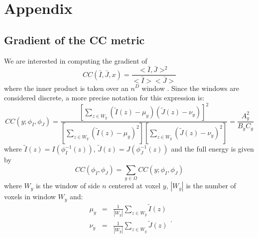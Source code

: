 \clearpage
\appendix
{}
\section*{Appendix}
\label{sec:appendix}

\renewcommand{\thesubsection}{\Alph{subsection}}

\subsection{Gradient of the CC metric}\label{ap:CC_gradient}
We are interested in computing the gradient of
\begin{equation}
    CC(\bar{I}, \bar{J}, x) = \frac{<\bar{I}, \bar{J}>^{2}}{<\bar{I}><\bar{J}>}
\end{equation}
where the inner product is taken over an $n^{D}$ window \citep[see][eq. 4]{Avants2008}. Since the windows are considered discrete, a more precise notation
for this expression is:
\begin{equation}\label{eq:CC_definition}
    CC(y;\phi_{I}, \phi_{J}) = \frac{\left[\sum_{z\in W_{y}} \left(\tilde{I}(z) - \mu_{y}\right)\left(\tilde{J}(z) - \nu_{y}\right)\right]^{2}}
    {\left[\sum_{z \in W_{y}}\left(\tilde{I}(z) - \mu_{y}\right)^{2}\right] \left[\sum_{z \in W_{y}}\left(\tilde{J}(z) - \nu_{y}\right)^{2}\right]} = \frac{A_{y}^{2}}{B_{y}C_{y}}
\end{equation}
where $\tilde{I}(z) = I(\phi_{I}^{-1}(z))$, $\tilde{J}(z) = J(\phi_{J}^{-1}(z))$ and the full energy is given by
\begin{equation}
    CC(\phi_{I}, \phi_{J}) = \sum_{y\in\Omega} CC(y; \phi_{I}, \phi_{J})
\end{equation}
where $W_{y}$ is the window of side $n$ centered at voxel $y$, $|W_{y}|$ is the number of voxels in window $W_{y}$ and:
\begin{equation}
    \begin{array}{lll}
        \mu_{y} &=& \frac{1}{|W_{y}|}\sum_{z \in W_{y}}\tilde{I}(z)\\[+2mm]
        \nu_{y} &=& \frac{1}{|W_{y}|}\sum_{z \in W_{y}}\tilde{J}(z)\\
    \end{array}.
\end{equation}

